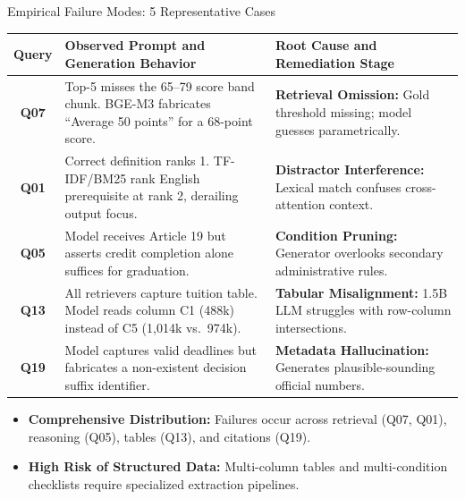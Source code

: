 \begin{frame}{Empirical Failure Modes: 5 Representative Cases}
  \vspace{-0.1cm}
  \begin{table}[H]
    \centering
    \scriptsize
    \renewcommand{\arraystretch}{1.15}
    \begin{tabularx}{\textwidth}{c X X}
      \toprule
      \rowcolor{tableheader}
      Query & Observed Prompt and Generation Behavior & Root Cause and Remediation Stage \\
      \midrule
      \textbf{Q07} & Top-5 misses the 65--79 score band chunk. BGE-M3 fabricates ``Average 50 points'' for a 68-point score. & \textbf{Retrieval Omission:} Gold threshold missing; model guesses parametrically. \\
      \textbf{Q01} & Correct definition ranks 1. TF-IDF/BM25 rank English prerequisite at rank 2, derailing output focus. & \textbf{Distractor Interference:} Lexical match confuses cross-attention context. \\
      \textbf{Q05} & Model receives Article 19 but asserts credit completion alone suffices for graduation. & \textbf{Condition Pruning:} Generator overlooks secondary administrative rules. \\
      \textbf{Q13} & All retrievers capture tuition table. Model reads column C1 (488k) instead of C5 (1,014k vs.\ 974k). & \textbf{Tabular Misalignment:} 1.5B LLM struggles with row-column intersections. \\
      \textbf{Q19} & Model captures valid deadlines but fabricates a non-existent decision suffix identifier. & \textbf{Metadata Hallucination:} Generates plausible-sounding official numbers. \\
      \bottomrule
    \end{tabularx}
  \end{table}

  \vspace{0.05cm}
  \begin{itemize}
    \setlength{\itemsep}{0.15cm}
    \item \textbf{Comprehensive Distribution:} Failures occur across retrieval (Q07, Q01), reasoning (Q05), tables (Q13), and citations (Q19).
    \item \textbf{High Risk of Structured Data:} Multi-column tables and multi-condition checklists require specialized extraction pipelines.
  \end{itemize}

\end{frame}
